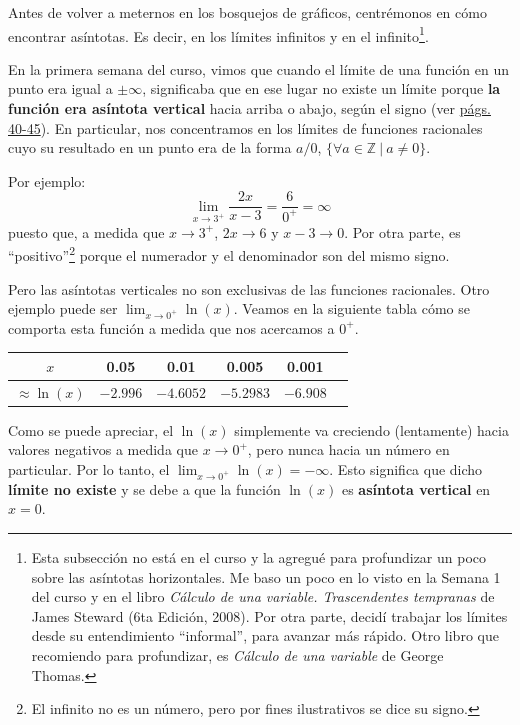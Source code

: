 \documentclass[12pt]{article}
\begin{document}
Antes de volver a meternos en los bosquejos de gráficos, centrémonos en cómo encontrar asíntotas. Es decir, en los límites infinitos y en el infinito\footnote{Esta subsección no está en el curso y la agregué para profundizar un poco sobre las asíntotas horizontales. Me baso un poco en lo visto en la Semana 1 del curso y en el libro \textit{Cálculo de una variable. Trascendentes tempranas} de James Steward (6ta Edición, 2008). Por otra parte, decidí trabajar los límites desde su entendimiento ``informal'', para avanzar más rápido. Otro libro que recomiendo para profundizar, es \textit{Cálculo de una variable} de George Thomas.}.

En la primera semana del curso, vimos que cuando el límite de una función en un punto era igual a $\pm \infty$, significaba que en ese lugar no existe un límite porque \textbf{la función era asíntota vertical} hacia arriba o abajo, según el signo (ver \href{../week-1/week_1.pdf}{págs. 40-45}). En particular, nos concentramos en los límites de funciones racionales cuyo su resultado en un punto era de la forma $a/0$, $\{\forall a \in \mathbb{Z} \ | \ a \neq 0\}$.

Por ejemplo:
\[
	\lim_{x \to 3^{+}} \frac{2x}{x - 3} =
	\frac{6}{0^{+}} = 
	\infty
\]
puesto que, a medida que $x \to 3^{+}$, $2x \to 6$ y $x - 3 \to 0$. Por otra parte, es ``positivo''\footnote{El infinito no es un número, pero por fines ilustrativos se dice su signo.} porque el numerador y el denominador son del mismo signo.

\newpage

Pero las asíntotas verticales no son exclusivas de las funciones racionales. Otro ejemplo puede ser $\lim_{x \to 0^{+}} \ln(x)$. Veamos en la siguiente tabla cómo se comporta esta función a medida que nos acercamos a $0^{+}$.

\begin{table}[hbt!]
\centering

{\renewcommand{\arraystretch}{1.3}
\begin{tabular}{c | c c c c c}
$x$ & 0.05 & 0.01 & 0.005 & 0.001\\
\hline
$\approx \ln(x)$ & $-2.996$ & $-4.6052$ & $-5.2983$ & $-6.908$
\end{tabular}
}

\end{table}

Como se puede apreciar, el $\ln(x)$ simplemente va creciendo (lentamente) hacia valores negativos a medida que $x \to 0^{+}$, pero nunca hacia un número en particular. Por lo tanto, el $\lim_{x \to 0^{+}} \ln(x) = -\infty$. Esto significa que dicho \textbf{límite no existe} y se debe a que la función $\ln(x)$ es \textbf{asíntota vertical} en $x = 0$.
\end{document}
